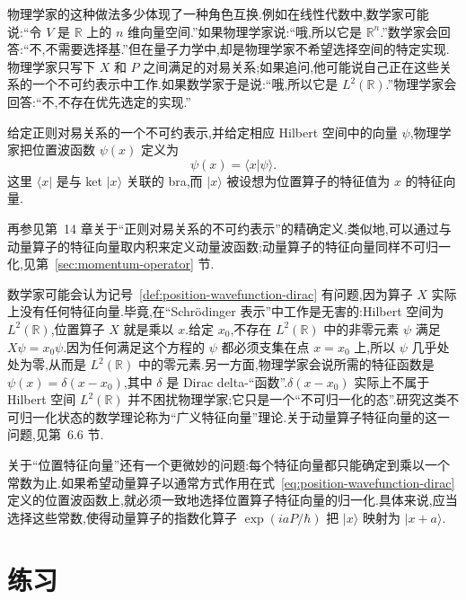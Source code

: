 物理学家的这种做法多少体现了一种角色互换.例如在线性代数中,数学家可能说:“令 \(V\) 是 \(\mathbb{R}\) 上的 \(n\) 维向量空间.”如果物理学家说:“哦,所以它是 \(\mathbb{R}^{n}\).”数学家会回答:“不,不需要选择基.”但在量子力学中,却是物理学家不希望选择空间的特定实现.物理学家只写下 \(X\) 和 \(P\) 之间满足的对易关系;如果追问,他可能说自己正在这些关系的一个不可约表示中工作.如果数学家于是说:“哦,所以它是 \(L^{2}(\mathbb{R})\).”物理学家会回答:“不,不存在优先选定的实现.”

\begin{definition}[记号 3.31:位置波函数]\label{def:position-wavefunction-dirac}
给定正则对易关系的一个不可约表示,并给定相应 Hilbert 空间中的向量 \(\psi\),物理学家把位置波函数 \(\psi(x)\) 定义为
\begin{equation}
\psi(x)=\langle x\vert\psi\rangle.
\label{eq:position-wavefunction-dirac}
\end{equation}
这里 \(\langle x\vert\) 是与 ket \(\lvert x\rangle\) 关联的 bra,而 \(\lvert x\rangle\) 被设想为位置算子的特征值为 \(x\) 的特征向量.
\end{definition}

再参见第~14 章关于“正则对易关系的不可约表示”的精确定义.类似地,可以通过与动量算子的特征向量取内积来定义动量波函数;动量算子的特征向量同样不可归一化,见第~\ref{sec:momentum-operator} 节.

数学家可能会认为记号~\ref{def:position-wavefunction-dirac} 有问题,因为算子 \(X\) 实际上没有任何特征向量.毕竟,在“Schrödinger 表示”中工作是无害的:Hilbert 空间为 \(L^{2}(\mathbb{R})\),位置算子 \(X\) 就是乘以 \(x\).给定 \(x_{0}\),不存在 \(L^{2}(\mathbb{R})\) 中的非零元素 \(\psi\) 满足 \(X\psi=x_{0}\psi\).因为任何满足这个方程的 \(\psi\) 都必须支集在点 \(x=x_{0}\) 上,所以 \(\psi\) 几乎处处为零,从而是 \(L^{2}(\mathbb{R})\) 中的零元素.另一方面,物理学家会说所需的特征函数是 \(\psi(x)=\delta(x-x_{0})\),其中 \(\delta\) 是 Dirac delta-“函数”.\(\delta(x-x_{0})\) 实际上不属于 Hilbert 空间 \(L^{2}(\mathbb{R})\) 并不困扰物理学家;它只是一个“不可归一化的态”.研究这类不可归一化状态的数学理论称为“广义特征向量”理论.关于动量算子特征向量的这一问题,见第~6.6 节.

关于“位置特征向量”还有一个更微妙的问题:每个特征向量都只能确定到乘以一个常数为止.如果希望动量算子以通常方式作用在式~\eqref{eq:position-wavefunction-dirac} 定义的位置波函数上,就必须一致地选择位置算子特征向量的归一化.具体来说,应当选择这些常数,使得动量算子的指数化算子 \(\exp(iaP/\hbar)\) 把 \(\lvert x\rangle\) 映射为 \(\lvert x+a\rangle\).

\section{练习}\label{sec:chapter3-exercises}

